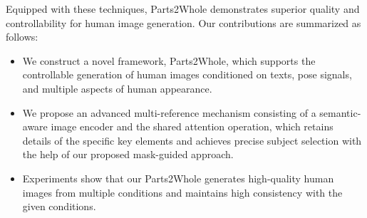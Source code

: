 Equipped with these techniques, Parts2Whole demonstrates superior quality and controllability for human image generation. Our contributions are summarized as follows:

\begin{itemize}
\item We construct a novel framework, Parts2Whole, which supports the controllable generation of human images conditioned on texts, pose signals, and multiple aspects of human appearance.
\item We propose an advanced multi-reference mechanism consisting of a semantic-aware image encoder and the shared attention operation, which retains details of the specific key elements and achieves precise subject selection with the help of our proposed mask-guided approach.
\item Experiments show that our Parts2Whole generates high-quality human images from multiple conditions and maintains high consistency with the given conditions.
\end{itemize}